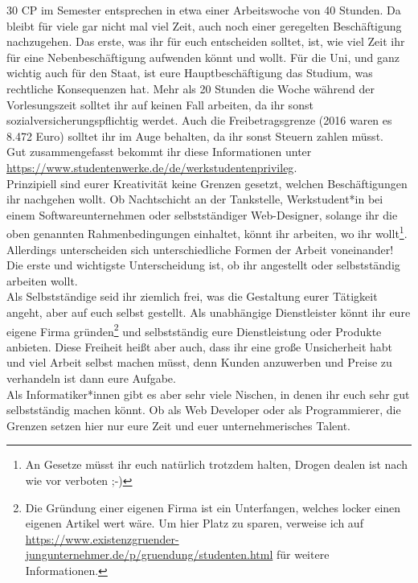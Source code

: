 {   30 CP im Semester entsprechen in etwa einer Arbeitswoche von 40 Stunden. Da
    bleibt für viele gar nicht mal viel Zeit, auch noch einer geregelten
    Beschäftigung nachzugehen. Das erste, was ihr für euch entscheiden solltet,
    ist, wie viel Zeit ihr für eine Nebenbeschäftigung aufwenden könnt und
    wollt. Für die Uni, und ganz wichtig auch für den Staat, ist eure
    Hauptbeschäftigung das Studium, was rechtliche Konsequenzen hat. Mehr als
    20 Stunden die Woche während der Vorlesungszeit solltet ihr auf keinen Fall
    arbeiten, da ihr sonst sozialversicherungspflichtig werdet. Auch die
    Freibetragsgrenze (2016 waren es 8.472 Euro) solltet ihr im Auge behalten,
    da ihr sonst Steuern zahlen müsst.\\ \vfill \columnbreak Gut zusammengefasst bekommt ihr diese
    Informationen unter \url{https://www.studentenwerke.de/de/werkstudentenprivileg}. \\
	
	Prinzipiell sind eurer Kreativität keine Grenzen gesetzt, welchen Beschäftigungen ihr nachgehen wollt. Ob Nachtschicht an der Tankstelle, Werkstudent*in bei einem Softwareunternehmen oder selbstständiger Web-Designer, solange ihr die oben genannten Rahmenbedingungen einhaltet, könnt ihr arbeiten, wo ihr wollt\footnote{An Gesetze müsst ihr euch natürlich trotzdem halten, Drogen dealen ist nach wie vor verboten ;-)}. Allerdings unterscheiden sich unterschiedliche Formen der Arbeit voneinander! Die erste und wichtigste Unterscheidung ist, ob ihr angestellt oder selbstständig arbeiten wollt. \\
	
	Als Selbstständige seid ihr ziemlich frei, was die Gestaltung eurer
    Tätigkeit angeht, aber auf euch selbst gestellt. Als unabhängige
    Dienstleister könnt ihr eure eigene Firma gründen\footnote{Die  Gründung
    einer eigenen Firma ist ein Unterfangen, welches locker einen eigenen
    Artikel wert wäre. Um hier Platz zu sparen, verweise ich auf\\
    \url{https://www.existenzgruender-jungunternehmer.de/p/gruendung/studenten.html}
    für weitere Informationen.} und selbstständig eure Dienstleistung oder
    Produkte anbieten. Diese Freiheit heißt aber auch, dass ihr eine große
    Unsicherheit habt und viel Arbeit selbst machen müsst, denn Kunden
    anzuwerben und Preise zu verhandeln ist dann eure
    Aufgabe.\\\vfill\columnbreak Als Informatiker*innen gibt es aber sehr viele Nischen, in denen ihr euch sehr gut selbstständig machen könnt. Ob als Web Developer oder als Programmierer, die Grenzen setzen hier nur eure Zeit und euer unternehmerisches Talent. \\
	
}
